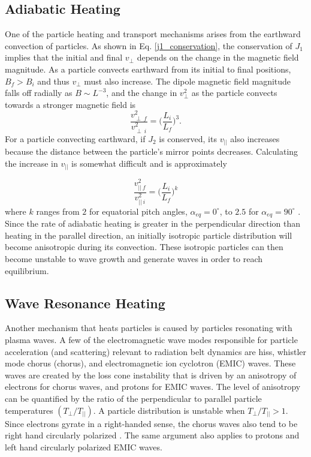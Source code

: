 \subsection{Adiabatic Heating}\label{Intro:adiabatic_heating}
One of the particle heating and transport mechanisms arises from the earthward convection of particles. As shown in Eq. \ref{j1_conservation}, the conservation of $J_1$ implies that the initial and final $v_\perp$ depends on the change in the magnetic field magnitude. As a particle convects earthward from its initial to final positions, $B_f > B_i$ and thus $v_\perp$ must also increase. The dipole magnetic field magnitude falls off radially as $B \sim L^{-3}$, and the change in $v^2_{\perp}$ as the particle convects towards a stronger magnetic field is
\begin{equation}
\frac{v_{\perp \ f}^2}{v_{\perp \ i}^2} = \bigg( \frac{L_i}{L_f} \bigg)^3.
\end{equation} For a particle convecting earthward, if $J_2$ is conserved, its $v_{||}$ also increases because the distance between the particle's mirror points decreases. Calculating the increase in $v_{||}$ is somewhat difficult and is approximately

\begin{equation}
\frac{v_{|| \ f}^2}{v_{|| \ i}^2} = \bigg( \frac{L_i}{L_f} \bigg)^k
\end{equation} where $k$ ranges from $2$ for equatorial pitch angles, $\alpha_{eq} = 0^\circ$, to $2.5$ for $\alpha_{eq} = 90^\circ$ \citep{Baumjohann1997}. Since the rate of adiabatic heating is greater in the perpendicular direction than heating in the parallel direction, an initially isotropic particle distribution will become anisotropic during its convection. These isotropic particles can then become unstable to wave growth and generate waves in order to reach equilibrium.


\subsection{Wave Resonance Heating}\label{Intro:wave_heating}
Another mechanism that heats particles is caused by particles resonating with plasma waves. A few of the electromagnetic wave modes responsible for particle acceleration (and scattering) relevant to radiation belt dynamics are hiss, whistler mode chorus (chorus), and electromagnetic ion cyclotron (EMIC) waves. These waves are created by the loss cone instability that is driven by an anisotropy of electrons for chorus waves, and protons for EMIC waves. The level of anisotropy can be quantified by the ratio of the perpendicular to parallel particle temperatures $(T_\perp/T_{||})$. A particle distribution is unstable when $T_\perp/T_{||} > 1$. Since electrons gyrate in a right-handed sense, the chorus waves also tend to be right hand circularly polarized \citep{Tsurutani1997}. The same argument also applies to protons and left hand circularly polarized EMIC waves. 

